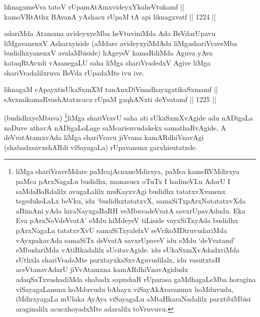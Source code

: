 
\begin{shl}
liknagxmeVva tatoV rUpamAtAmxvideyxYkaheVtukamf || \\
kamoVRtAthx BAvanA yAshacx rUpaM tA api liknagxvatf \hfill || 1224 ||  
\end{shl}

\begin{artha}
adariMda Atamxna avideyxyeMba heVtuviniMda Ada BeVdarUpavu liMgavanenxV Asharxyiside (aMdare avideyxyiMdAda liMgashariVraveMba budidhxyanenxV avalaMbiside) hAgeyeV kamaRdiMda Aguva yAva kataqRtAvxdi vAsanegaLU saha liMga shariVradedxV Agive liMga shariVradalilxruva BeVda rUpadaMte ivu ive.
\end{artha}


\begin{shl}
liknagxM cApayxtisUkaSxmXM tanAnxDiVmadhayxgatikaSxmamf || \\
sAvxmikamaRvashAtatxcacx rUpaM gaqhANxti deYvatamf \hfill || 1225 || 
\end{shl}

\begin{artha}
(budidhxyeMbuva) \footnote{liMga shariVraveMdare paMcajAcnxneMdirxya, paMca kameRVMdirxya paMca pArxNagaLu budidhx, manasusx oTuTx I hadineVLu AdarU I saMdaBaRdalilx avugaLalilx muKayxvAgi budidhx tatatxvXvanenx tegedukoLaLx beVku, idu `budidhxtatatxvX, samaSiTxpArxNatatatxvXda aBimAni yAda hiraNayxgaBaRH veMbuvadeVvatA savxrUpavAdudu. Eka Eva pArxNoVdeVvatA' eMdu hiMdeyeV tiLiside vayxSiTxyAda budidhx pArxNagaLa tatatxvXvU samaSiTxyalelxV seVrikoMDiruvudariMda vAyxpakavAda samaSiTx deVvatA savxrUpaveV idu eMdu `deYvatamf' eMbudariMda vAtiRkadalilx sUcitavAgide. idu sUkaSxmXvAdadxriMda sUthxla shariVradaMte parxtayxkaSxvAguvudilalx, idu vasutxtaH aceVtanavAdarU jiVvAtamxna kamARdhiVnavAgidudx adaqSaTxvashadiMda shabadx sapxshaR rUparasa gaMdhagaLeMba horagina viSayagaLanunx hoMduvudu bAhayx viSayAkAravanunx hoMduvudu, iMdirxyagaLa mUlaka AyAya viSayagaLu aMtaHkaraNadalilx parxtibiMbisi araginalilx acucxhoyadxMte adaralilx toVruvuvu.}liMga shariVravU saha ati sUkaSxmXvAgide adu nADigaLa naDuve athavA nADigaLoLage saMcarisuvudakekx samathaRvAgide, A deVvatAtamxvAda liMga shariVravu jiVvana kamARdhiVnavAgi (shabadxsavxshARdi viSayagaLa) rUpavanunx garxhisutatxde.
\end{artha}

